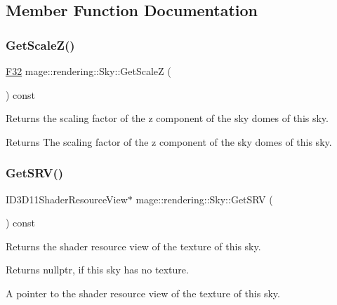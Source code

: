 \subsection{Member Function Documentation}
\mbox{\label{classmage_1_1rendering_1_1_sky_a12023dbc7f9511152719cee35a84fc34}} 
\subsubsection{\texorpdfstring{Get\+Scale\+Z()}{GetScaleZ()}}
{\footnotesize\ttfamily \mbox{\hyperlink{namespacemage_aa97e833b45f06d60a0a9c4fc22ae02c0}{F32}} mage\+::rendering\+::\+Sky\+::\+Get\+ScaleZ (\begin{DoxyParamCaption}{ }\end{DoxyParamCaption}) const\hspace{0.3cm}{\ttfamily [noexcept]}}

Returns the scaling factor of the z component of the sky domes of this sky.

\begin{DoxyReturn}{Returns}
The scaling factor of the z component of the sky domes of this sky. 
\end{DoxyReturn}
\mbox{\label{classmage_1_1rendering_1_1_sky_a8ded7262b242de3e76e4bdcd5a91f4c3}} 
\subsubsection{\texorpdfstring{Get\+S\+R\+V()}{GetSRV()}}
{\footnotesize\ttfamily I\+D3\+D11\+Shader\+Resource\+View$\ast$ mage\+::rendering\+::\+Sky\+::\+Get\+S\+RV (\begin{DoxyParamCaption}{ }\end{DoxyParamCaption}) const\hspace{0.3cm}{\ttfamily [noexcept]}}

Returns the shader resource view of the texture of this sky.

\begin{DoxyReturn}{Returns}
{\ttfamily nullptr}, if this sky has no texture. 

A pointer to the shader resource view of the texture of this sky. 
\end{DoxyReturn}
\mbox{\label{classmage_1_1rendering_1_1_sky_a575698f7fafad47d544f88bf4e2eea5e}} 
